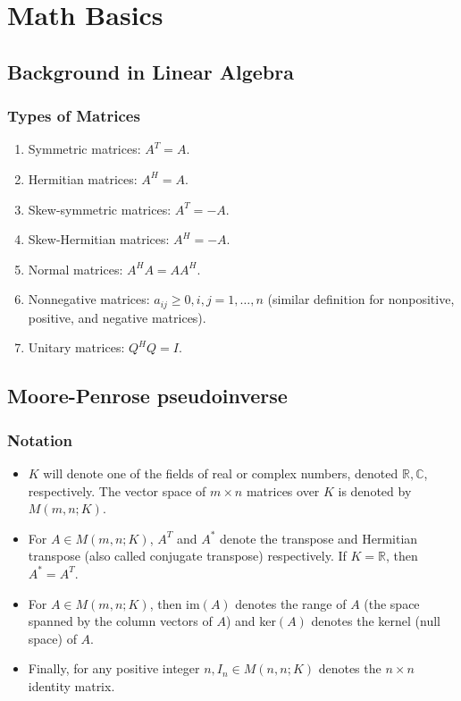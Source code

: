\chapter{Math Basics}
\label{mathbase}
\section{Background in Linear Algebra}
\subsection{Types of Matrices}
\begin{enumerate}
    \item Symmetric matrices: $A^T = A$.
    \item Hermitian matrices: $A^H = A$.
    \item Skew-symmetric matrices: $A^T = -A$.
    \item Skew-Hermitian matrices: $A^H = -A$.
    \item Normal matrices: $A^H A = A A^H$.
    \item Nonnegative matrices: $a_{ij}\geq 0, i,j=1,\dots,n$ (similar definition for nonpositive, positive, and negative matrices).
    \item Unitary matrices: $Q^H Q = I$.
\end{enumerate}

\section{Moore-Penrose pseudoinverse}
\label{moore-penrose}
\subsection{Notation}
\begin{itemize}
    \item $K$ will denote one of the fields of real or complex numbers, denoted $\mathbb{R},\mathbb{C}$, respectively. The vector space of $m\times n$ matrices over $K$ is denoted by $M(m,n;K)$.
    \item For $A \in M(m,n;K)$, $A^T$ and $A^*$ denote the transpose and Hermitian transpose (also called conjugate transpose) respectively. If $K = \mathbb{R}$, then $A^* = A^T$.
    \item For $A \in M(m,n;K)$, then im$(A)$ denotes the range of $A$ (the space spanned by the column vectors of $A$) and ker$(A)$ \textcolor[rgb]{1,0,0}{denotes the kernel (null space)} of $A$.
    \item Finally, for any positive integer $n, I_n \in M(n,n;K)$ denotes the $n \times n$ identity matrix.
\end{itemize}

